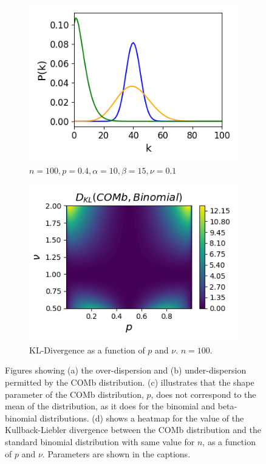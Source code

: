 \documentclass[a4paper,12pt]{article}
\theoremstyle{definition}
\begin{document}
\begin{figure}[h]
        \begin{subfigure}[h]{0.5\linewidth}
          \includegraphics[width=\textwidth]{figures/comb_skewed.png}
          \caption{$n=100, p=0.4, \alpha=10, \beta=15, \nu=0.1$}
          \label{fig:comb_skewed}
        \end{subfigure}
        \begin{subfigure}[h]{0.5\linewidth}
          \includegraphics[width=\textwidth]{figures/comb_bin_dkl.png}
          \caption{KL-Divergence as a function of $p$ and $\nu$. $n=100$.}
          \label{fig:comb_bin_dkl}
        \end{subfigure}
        \caption{Figures showing (a) the over-dispersion and (b) under-dispersion permitted by the COMb distribution. (c) illustrates that the shape parameter of the COMb distribution, $p$, does not correspond to the mean of the distribution, as it does for the binomial and beta-binomial distributions. (d) shows a heatmap for the value of the Kullback-Liebler divergence between the COMb distribution and the standard binomial distribution with same value for $n$, as a function of $p$ and $\nu$. Parameters are shown in the captions.}
      \end{figure}
\end{document}
